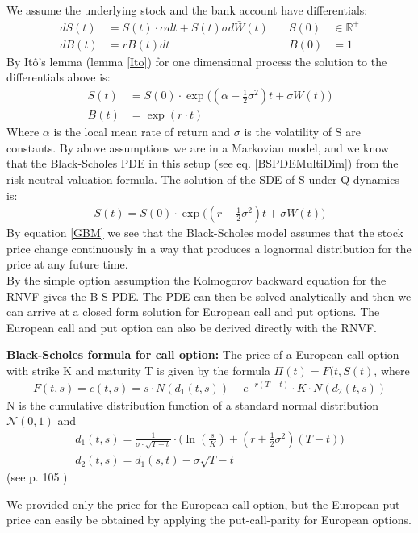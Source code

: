 We assume the underlying stock and the bank account have differentials:
\begin{align}
dS(t)&=S(t)\cdot \alpha dt+S(t) \sigma d\bar{W}(t) \quad & S(0) &\in \mathbb{R}^+ \\
dB(t)&=r B(t)dt \quad & B(0) &= 1
\end{align}
By Itô's lemma (lemma \ref{Ito}) for one dimensional process the solution to the differentials above is:
\begin{align}
S(t)&=S(0) \cdot \exp \bigg( (\alpha -\frac{1}{2} \sigma^2) t + \sigma W(t) \bigg) \\
B(t)&=\exp(r\cdot t)
\end{align}
Where $\alpha$ is the local mean rate of return and $\sigma$ is the volatility of S are constants. By above assumptions we are in a Markovian model, and we know that the Black-Scholes PDE in this setup (see eq.  \ref{BSPDEMultiDim}) from the risk neutral valuation formula. The solution of the SDE of S under Q dynamics is:
\begin{equation}\label{GBM}
\begin{split}
S(t)=S(0) \cdot \exp \bigg( (r -\frac{1}{2} \sigma^2) t + \sigma W(t) \bigg)
\end{split}
\end{equation}
By equation \eqref{GBM} we see that the Black-Scholes model assumes that the stock price change continuously in a way that produces a lognormal distribution for the price at any future time. \\

By the simple option assumption the Kolmogorov backward equation for the RNVF gives the B-S PDE. The PDE can then be solved analytically and then we can arrive at a closed form solution for European call and put options. The European call and put option can also be derived directly with the RNVF. 

\theoremstyle{proposition}
\begin{proposition}{}\label{BS-price-EuroCall}
\textbf{Black-Scholes formula for call option: } The price of a European call option with strike K and maturity T is given by the formula  $\Pi(t)=F(t,S(t)$, where
\begin{align*}
F(t,s)=c(t,s)=s \cdot N(d_1(t,s)) - e^{-r(T-t)}\cdot K \cdot N(d_2(t,s))
\end{align*}
N is the cumulative distribution function of a standard normal distribution $\mathcal{N}(0,1)$ and
\begin{align*}
d_1(t,s)=\frac{1}{\sigma\cdot \sqrt{T-t}} \cdot \bigg( \ln(\frac{s}{K}) + (r+\frac{1}{2} \sigma^2) (T-t) \bigg)\\
d_2(t,s)=d_1(s,t)-\sigma \sqrt{T-t}
\end{align*}
(see p. 105 \parencite{finKont})
\end{proposition}
We provided only the price for the European call option, but the European put price can easily be obtained by applying the put-call-parity for European options.

